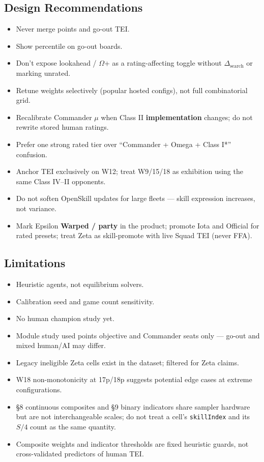 \documentclass[11pt,letterpaper]{article}
\begin{document}
\subsection{Design Recommendations}
\begin{itemize}
\item Never merge points and go-out TEI.
\item Show percentile on go-out boards.
\item Don't expose lookahead / $\Omega$+ as a rating-affecting toggle without $\Delta_{\text{search}}$ or marking unrated.
\item Retune weights selectively (popular hosted configs), not full combinatorial grid.
\item Recalibrate Commander $\mu$ when Class II \textbf{implementation} changes; do not rewrite stored human ratings.
\item Prefer one strong rated tier over ``Commander + Omega + Class I*'' confusion.
\item Anchor TEI exclusively on W12; treat W9/15/18 as exhibition using the same Class IV--II opponents.
\item Do not soften OpenSkill updates for large fleets --- skill expression increases, not variance.
\item Mark Epsilon \textbf{Warped / party} in the product; promote Iota and Official for rated presets; treat Zeta as skill-promote with live Squad TEI (never FFA).
\end{itemize}

\subsection{Limitations}
\begin{itemize}
\item Heuristic agents, not equilibrium solvers.
\item Calibration seed and game count sensitivity.
\item No human champion study yet.
\item Module study used points objective and Commander seats only --- go-out and mixed human/AI may differ.
\item Legacy ineligible Zeta cells exist in the dataset; filtered for Zeta claims.
\item W18 non-monotonicity at 17p/18p suggests potential edge cases at extreme configurations.
\item §8 continuous composites and §9 binary indicators share sampler hardware but are not interchangeable scales; do not treat a cell's \texttt{skillIndex} and its $S/4$ count as the same quantity.
\item Composite weights and indicator thresholds are fixed heuristic guards, not cross-validated predictors of human TEI.
\end{itemize}
\end{document}
